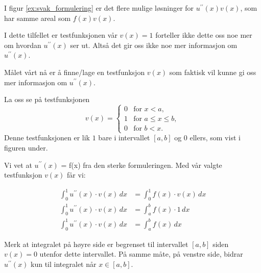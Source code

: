 I figur \ref{ex:svak_formulering} er det flere mulige løsninger for $u^{\prime\prime}(x)v(x)$, som har samme areal som $f(x)v(x)$.

I dette tilfellet er testfunksjonen vår $v(x) = 1$ forteller ikke dette oss noe mer om hvordan $u^{\prime\prime}(x)$ ser ut.
Altså det gir oss ikke noe mer informasjon om $u^{\prime\prime}(x)$.

Målet vårt nå er å finne/lage en testfunksjon $v(x)$ som faktisk vil kunne gi oss mer informasjon om $u^{\prime\prime}(x)$.

La oss se på testfunksjonen
\[
	v(x) =
	\begin{cases}
		0 & \text{for } x < a,           \\
		1 & \text{for } a \leq x \leq b, \\
		0 & \text{for } b < x.
	\end{cases}
\]
Denne testfunksjonen er lik $1$ bare i intervallet $[a,b]$ og $0$ ellers, som vist i figuren under.



Vi vet at $u^{\prime\prime}(x)$ = f(x) fra den sterke formuleringen. Med vår valgte testfunksjon $v(x)$ får vi:

\begin{align*}
	\int_0^1 u^{\prime\prime}(x) \cdot v(x) \, dx & = \int_0^1 f(x) \cdot v(x) \, dx \\
	\int_0^1 u^{\prime\prime}(x) \cdot v(x) \, dx & = \int_a^b f(x) \cdot 1 \, dx    \\
	\int_0^1 u^{\prime\prime}(x) \cdot v(x) \, dx & = \int_a^b f(x) \, dx
\end{align*}

Merk at integralet på høyre side er begrenset til intervallet $[a,b]$ siden $v(x)=0$ utenfor dette intervallet. På samme måte, på venstre side, bidrar $u^{\prime\prime}(x)$ kun til integralet når $x \in [a,b]$.

